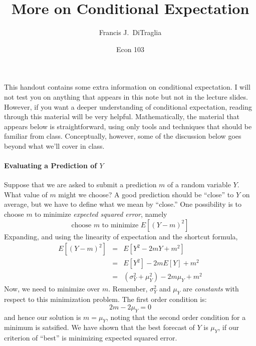 \documentclass[12pt]{article}
\title{More on Conditional Expectation}
\author{Francis J.\ DiTraglia}
\date{Econ 103}
\begin{document}
\maketitle

\noindent This handout contains some extra information on conditional expectation.
I will not test you on anything that appears in this note but not in the lecture slides.
However, if you want a deeper understanding of conditional expectation, reading through this material will be very helpful.
Mathematically, the material that appears below is straightforward, using only tools and techniques that should be familiar from class.
Conceptually, however, some of the discussion below goes beyond what we'll cover in class.

\paragraph{Evaluating a Prediction of $Y$}
Suppose that we are asked to submit a prediction $m$ of a random variable $Y$.
What value of $m$ might we choose?
A good prediction should be ``close'' to $Y$ on average, but we have to define what we mean by ``close.'' 
One possibility is to choose $m$ to minimize \emph{expected squared error}, namely 
\[
  \mbox{choose } m \mbox{ to minimize }  E\left[ (Y - m)^2 \right]
\]
Expanding, and using the linearity of expectation and the shortcut formula,
\begin{eqnarray*}
  E\left[ (Y-m)^2 \right] &=& E\left[ Y^2 - 2mY + m^2 \right]\\
  &=& E[Y^2] - 2m E[Y] + m^2\\
  &=& \left(\sigma^2_Y + \mu_Y^2\right) - 2m \mu_Y + m^2
\end{eqnarray*}
Now, we need to minimize over $m$.
Remember, $\sigma_Y^2$ and $\mu_Y$ are \emph{constants} with respect to this minimization problem.
The first order condition is:
\[
  2m - 2\mu_Y = 0
\]
and hence our solution is $m = \mu_Y$, noting that the second order condition for a minimum is satsified.
We have shown that the best forecast of $Y$ is $\mu_Y$, if our criterion of ``best'' is minimizing expected squared error.
\end{document}
